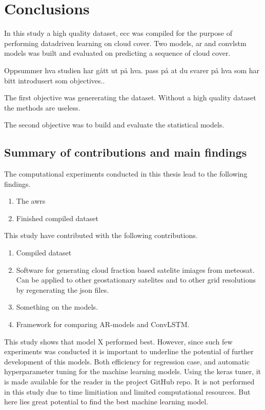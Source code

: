 \chapter{Conclusions}
In this study a high quality dataset, \acrfull{ecc} was compiled for the purpose of performing datadriven learning on cloud cover. Two models, \acrfull{ar} and \acrlong{convlstm} models was built and evaluated on predicting a sequence of cloud cover.

Oppsummer hva studien har gått ut på hva. pass på at du svarer på hva som har bitt introdusert som objectives..

The first objective was genererating the dataset. Without a high quality dataset the methods are useless. 

The second objective was to build and evaluate the statistical models. 

\section{Summary of contributions and main findings }
The computational experiments conducted in this thesis lead to the following findings. 
\begin{enumerate}
    \item The \acrfull{awrs}
    \item Finished compiled dataset
\end{enumerate}

This study have contributed with the following contributions.
\begin{enumerate}
    \item Compiled dataset 
    \item Software for generating cloud fraction based satelite imiages from meteosat. Can be applied to other geostationary satelites and to other grid resolutions by regenerating the json files.
    \item Something on the models. 
    \item Framework for comparing AR-models and ConvLSTM.
\end{enumerate}

This study shows that model X performed best. However, since such few experiments was conducted it is important to underline the potential of further development of this models. Both efficiency for regression case, and automatic hyperparameter tuning for the machine learning models. Using the keras tuner, it is made available for the reader in the project GitHub repo. It is not performed in this study due to time limitiation and limited computational resources. But here lies great potential to find the best machine learning model. 

